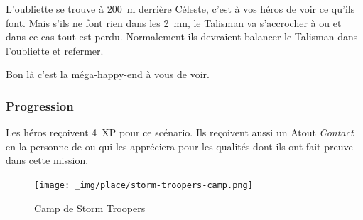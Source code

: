 L’oubliette se trouve à 200~m derrière Céleste, c’est à vos héros de voir ce qu’ils font. Mais s’ils ne font rien dans les 2~mn, le Talisman va s’accrocher à  ou  et dans ce cas tout est perdu. Normalement ils devraient balancer le Talisman dans l’oubliette et refermer.

Bon là c’est la méga-happy-end à vous de voir.

\subsubsection{Progression}
Les héros reçoivent 4~XP pour ce scénario. Ils reçoivent aussi un Atout \textit{Contact} en la personne de  ou  qui les appréciera pour les qualités dont ils ont fait preuve dans cette mission.

\begin{figure}
    \centering
    \texttt{[image: \_img/place/storm-troopers-camp.png]}
    \caption{\label{fig:storm-troopers-camp}Camp de Storm Troopers}
\end{figure}